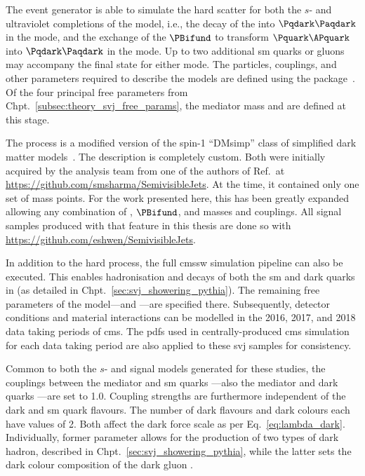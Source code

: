 The \MADGRAPHFULL event generator is able to simulate the hard scatter for both the $s$- and \tchannel ultraviolet completions of the model, i.e., the decay of the \PZprime into $\Pqdark\Paqdark$ in the \schannel mode, and the exchange of the $\PBifund$ to transform $\Pquark\APquark$ into $\Pqdark\Paqdark$ in the \tchannel mode. Up to two additional \acrlong{sm} quarks or gluons may accompany the final state for either mode. The particles, couplings, and other parameters required to describe the models are defined using the \FEYNRULES package~\cite{Alloul:2013bka}. Of the four principal free parameters from Chpt.~\ref{subsec:theory_svj_free_params}, the mediator mass and \mqdark are defined at this stage.

The \schannel process is a modified version of the spin-1 ``DMsimp'' class of simplified dark matter models~\cite{Backovic:2015soa}. The \tchannel description is completely custom. Both were initially acquired by the analysis team from one of the authors of Ref.~at \url{https://github.com/smsharma/SemivisibleJets}. At the time, it contained only one set of mass points. For the work presented here, this has been greatly expanded allowing any combination of \PZprime, $\PBifund$, and \Pqdark masses and couplings. All signal samples produced with \MADGRAPH that feature in this thesis are done so with \url{https://github.com/eshwen/SemivisibleJets}. %

In addition to the hard process, the full \acrshort{cmssw} simulation pipeline can also be executed. This enables hadronisation and decays of both the \acrshort{sm} and dark quarks in \PYTHIA (as detailed in Chpt.~\ref{sec:svj_showering_pythia}). The remaining free parameters of the model---\aDark and \rinv---are specified there. Subsequently, detector conditions and material interactions can be modelled in the 2016, 2017, and 2018 data taking periods of \acrshort{cms}. The \glspl{pdf} used in centrally-produced \acrshort{cms} simulation for each data taking period are also applied to these \gls{svj} samples for consistency.

Common to both the $s$- and \tchannel signal models generated for these studies, the couplings between the mediator and \acrshort{sm} quarks \gq---also the mediator and dark quarks \gqdark---are set to 1.0. Coupling strengths are furthermore independent of the dark and \acrshort{sm} quark flavours. The number of dark flavours and dark colours each have values of 2. Both affect the dark force scale as per Eq.~\ref{eq:lambda_dark}. Individually, former parameter allows for the production of two types of dark hadron, described in Chpt.~\ref{sec:svj_showering_pythia}, while the latter sets the dark colour composition of the dark gluon \Pgdark. 


